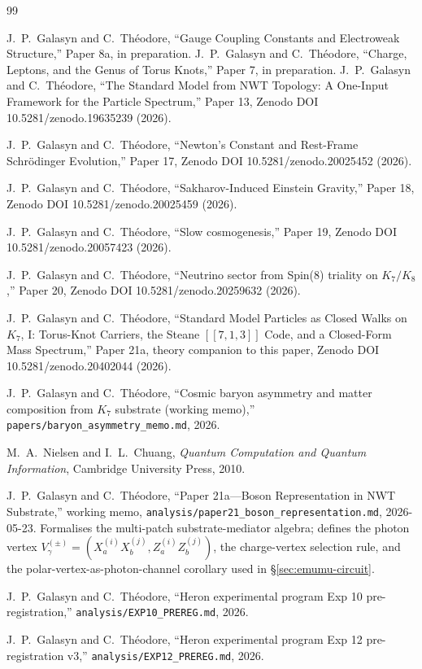 \documentclass[11pt]{article}
\newcommand{\Klogical}{[[7, 1, 3]]}
\begin{document}

\begin{thebibliography}{99}

 J.~P.~Galasyn and C.~Th\'eodore, ``Gauge Coupling Constants and Electroweak Structure,'' Paper 8a, in preparation.
 J.~P.~Galasyn and C.~Th\'eodore, ``Charge, Leptons, and the Genus of Torus Knots,'' Paper 7, in preparation.
 J.~P.~Galasyn and C.~Th\'eodore, ``The Standard Model from NWT Topology: A One-Input Framework for the Particle Spectrum,'' Paper 13, Zenodo DOI 10.5281/zenodo.19635239 (2026).

 J.~P.~Galasyn and C.~Th\'eodore, ``Newton's Constant and Rest-Frame Schr\"odinger Evolution,'' Paper 17, Zenodo DOI 10.5281/zenodo.20025452 (2026).

 J.~P.~Galasyn and C.~Th\'eodore, ``Sakharov-Induced Einstein Gravity,'' Paper 18, Zenodo DOI 10.5281/zenodo.20025459 (2026).

 J.~P.~Galasyn and C.~Th\'eodore, ``Slow cosmogenesis,'' Paper 19, Zenodo DOI 10.5281/zenodo.20057423 (2026).

 J.~P.~Galasyn and C.~Th\'eodore, ``Neutrino sector from Spin(8) triality on $K_7 / K_8$,'' Paper 20, Zenodo DOI 10.5281/zenodo.20259632 (2026).

 J.~P.~Galasyn and C.~Th\'eodore, ``Standard Model Particles as Closed Walks on $K_7$, I: Torus-Knot Carriers, the Steane $\Klogical$ Code, and a Closed-Form Mass Spectrum,'' Paper 21a, theory companion to this paper, Zenodo DOI 10.5281/zenodo.20402044 (2026).


 J.~P.~Galasyn and C.~Th\'eodore, ``Cosmic baryon asymmetry and matter composition from $K_7$ substrate (working memo),'' \texttt{papers/baryon\_asymmetry\_memo.md}, 2026.

 M.~A.~Nielsen and I.~L.~Chuang, \emph{Quantum Computation and Quantum Information}, Cambridge University Press, 2010.

 J.~P.~Galasyn and C.~Th\'eodore, ``Paper 21a---Boson Representation in NWT Substrate,'' working memo, \texttt{analysis/paper21\_boson\_representation.md}, 2026-05-23.  Formalises the multi-patch substrate-mediator algebra; defines the photon vertex $V_\gamma^{(\pm)} = (X_a^{(i)} X_b^{(j)}, Z_a^{(i)} Z_b^{(j)})$, the charge-vertex selection rule, and the polar-vertex-as-photon-channel corollary used in \S\ref{sec:emumu-circuit}.

 J.~P.~Galasyn and C.~Th\'eodore, ``Heron experimental program Exp 10 pre-registration,'' \texttt{analysis/EXP10\_PREREG.md}, 2026.

 J.~P.~Galasyn and C.~Th\'eodore, ``Heron experimental program Exp 12 pre-registration v3,'' \texttt{analysis/EXP12\_PREREG.md}, 2026.

\end{thebibliography}
\end{document}
